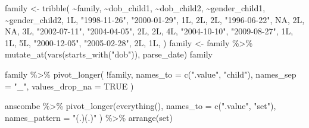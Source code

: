 \documentclass[
]{book}
\newenvironment{Shaded}{\begin{snugshade}}{\end{snugshade}}
\newcommand{\AttributeTok}[1]{\textcolor[rgb]{0.77,0.63,0.00}{#1}}
\newcommand{\ConstantTok}[1]{\textcolor[rgb]{0.00,0.00,0.00}{#1}}
\newcommand{\FunctionTok}[1]{\textcolor[rgb]{0.00,0.00,0.00}{#1}}
\newcommand{\NormalTok}[1]{#1}
\newcommand{\OtherTok}[1]{\textcolor[rgb]{0.56,0.35,0.01}{#1}}
\newcommand{\SpecialCharTok}[1]{\textcolor[rgb]{0.00,0.00,0.00}{#1}}
\newcommand{\StringTok}[1]{\textcolor[rgb]{0.31,0.60,0.02}{#1}}
\begin{document}
\begin{Shaded}
\begin{Highlighting}[]
\NormalTok{family }\OtherTok{\textless{}{-}} \FunctionTok{tribble}\NormalTok{(}
  \SpecialCharTok{\textasciitilde{}}\NormalTok{family, }\SpecialCharTok{\textasciitilde{}}\NormalTok{dob\_child1, }\SpecialCharTok{\textasciitilde{}}\NormalTok{dob\_child2, }\SpecialCharTok{\textasciitilde{}}\NormalTok{gender\_child1, }\SpecialCharTok{\textasciitilde{}}\NormalTok{gender\_child2,}
\NormalTok{  1L, }\StringTok{"1998{-}11{-}26"}\NormalTok{, }\StringTok{"2000{-}01{-}29"}\NormalTok{, 1L, 2L,}
\NormalTok{  2L, }\StringTok{"1996{-}06{-}22"}\NormalTok{, }\ConstantTok{NA}\NormalTok{, 2L, }\ConstantTok{NA}\NormalTok{,}
\NormalTok{  3L, }\StringTok{"2002{-}07{-}11"}\NormalTok{, }\StringTok{"2004{-}04{-}05"}\NormalTok{, 2L, 2L,}
\NormalTok{  4L, }\StringTok{"2004{-}10{-}10"}\NormalTok{, }\StringTok{"2009{-}08{-}27"}\NormalTok{, 1L, 1L,}
\NormalTok{  5L, }\StringTok{"2000{-}12{-}05"}\NormalTok{, }\StringTok{"2005{-}02{-}28"}\NormalTok{, 2L, 1L,}
\NormalTok{)}
\NormalTok{family }\OtherTok{\textless{}{-}}\NormalTok{ family }\SpecialCharTok{\%\textgreater{}\%} \FunctionTok{mutate\_at}\NormalTok{(}\FunctionTok{vars}\NormalTok{(}\FunctionTok{starts\_with}\NormalTok{(}\StringTok{"dob"}\NormalTok{)), parse\_date)}
\NormalTok{family}
\end{Highlighting}
\end{Shaded}

\begin{Shaded}
\begin{Highlighting}[]

\NormalTok{family }\SpecialCharTok{\%\textgreater{}\%} 
  \FunctionTok{pivot\_longer}\NormalTok{(}
    \SpecialCharTok{!}\NormalTok{family, }
    \AttributeTok{names\_to =} \FunctionTok{c}\NormalTok{(}\StringTok{".value"}\NormalTok{, }\StringTok{"child"}\NormalTok{), }
    \AttributeTok{names\_sep =} \StringTok{"\_"}\NormalTok{, }
    \AttributeTok{values\_drop\_na =} \ConstantTok{TRUE}
\NormalTok{  )}
\end{Highlighting}
\end{Shaded}

\begin{Shaded}
\begin{Highlighting}[]
\NormalTok{anscombe }\SpecialCharTok{\%\textgreater{}\%} 
  \FunctionTok{pivot\_longer}\NormalTok{(}\FunctionTok{everything}\NormalTok{(), }
    \AttributeTok{names\_to =} \FunctionTok{c}\NormalTok{(}\StringTok{".value"}\NormalTok{, }\StringTok{"set"}\NormalTok{), }
    \AttributeTok{names\_pattern =} \StringTok{"(.)(.)"}
\NormalTok{  ) }\SpecialCharTok{\%\textgreater{}\%} 
  \FunctionTok{arrange}\NormalTok{(set)}
\end{Highlighting}
\end{Shaded}
\end{document}
